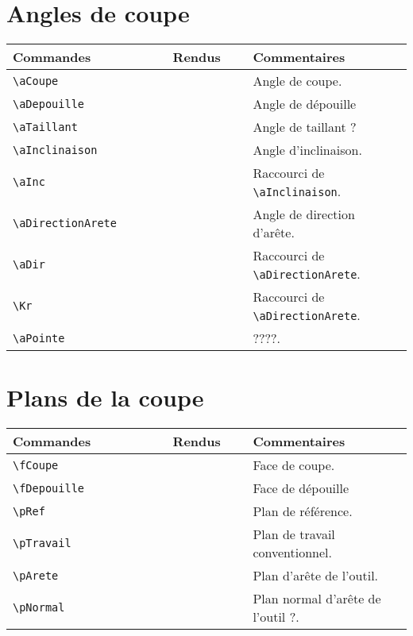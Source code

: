 \documentclass[a4paper,12pt]{article}
\begin{document}
	\section{Angles de coupe}
		\noindent
		\begin{tabular}{|p{0.4\linewidth}|p{0.2\linewidth}|p{0.4\linewidth}|}
			\hline
				\textbf{Commandes}&\textbf{Rendus}&\textbf{Commentaires}
			\\\hline\hline
				\verb!\aCoupe!		&	\aCoupe		&	Angle de coupe.
			\\\hline
				\verb!\aDepouille!	&	\aDepouille	&	Angle de dépouille
			\\\hline
				\verb!\aTaillant!	&	\aTaillant	&	Angle de taillant ?
			\\\hline
				\verb!\aInclinaison!	&	\aInclinaison	&	Angle d'inclinaison.
			\\\hline
				\verb!\aInc!		&	\aInc		&	Raccourci de \verb!\aInclinaison!.
			\\\hline
				\verb!\aDirectionArete!	&	\aDirectionArete	&	Angle de direction d'arête.
			\\\hline
				\verb!\aDir!		&	\aDir		&	Raccourci de \verb!\aDirectionArete!.
			\\\hline
				\verb!\Kr!		&	\Kr		&	Raccourci de \verb!\aDirectionArete!.
			\\\hline
				\verb!\aPointe!		&	\aPointe		&	????.
			\\\hline
		\end{tabular}



	\section{Plans de la coupe}
		\noindent
		\begin{tabular}{|p{0.4\linewidth}|p{0.2\linewidth}|p{0.4\linewidth}|}
			\hline
				\textbf{Commandes}&\textbf{Rendus}&\textbf{Commentaires}
			\\\hline\hline
				\verb!\fCoupe!		&	\fCoupe		&	Face de coupe.
			\\\hline
				\verb!\fDepouille!	&	\fDepouille	&	Face de dépouille
			\\\hline
				\verb!\pRef!		&	\pRef		&	Plan de référence.
			\\\hline
				\verb!\pTravail!		&	\pTravail	&	Plan de travail conventionnel.
			\\\hline
				\verb!\pArete!		&	\pArete		&	Plan d'arête de l'outil.
			\\\hline
				\verb!\pNormal!		&	\pNormal		&	Plan normal d'arête de l'outil ?.
			\\\hline
		\end{tabular}
\end{document}

